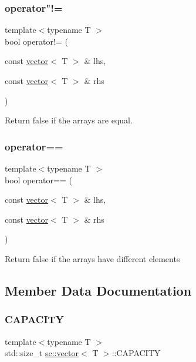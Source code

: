 \subsubsection{\texorpdfstring{operator"!=}{operator!=}}
{\footnotesize\ttfamily template$<$typename T $>$ \\
bool operator!= (\begin{DoxyParamCaption}\item[{const \hyperlink{classsc_1_1vector}{vector}$<$ T $>$ \&}]{lhs,  }\item[{const \hyperlink{classsc_1_1vector}{vector}$<$ T $>$ \&}]{rhs }\end{DoxyParamCaption})\hspace{0.3cm}{\ttfamily [friend]}}

Return false if the arrays are equal. \mbox{\label{classsc_1_1vector_a33679563540934e4c3e487aa12a63424}} 
\subsubsection{\texorpdfstring{operator==}{operator==}}
{\footnotesize\ttfamily template$<$typename T $>$ \\
bool operator== (\begin{DoxyParamCaption}\item[{const \hyperlink{classsc_1_1vector}{vector}$<$ T $>$ \&}]{lhs,  }\item[{const \hyperlink{classsc_1_1vector}{vector}$<$ T $>$ \&}]{rhs }\end{DoxyParamCaption})\hspace{0.3cm}{\ttfamily [friend]}}

Return false if the arrays have different elements 

\subsection{Member Data Documentation}
\mbox{\label{classsc_1_1vector_ae4c67859be8cfdd445d2700d55125184}} 
\subsubsection{\texorpdfstring{C\+A\+P\+A\+C\+I\+TY}{CAPACITY}}
{\footnotesize\ttfamily template$<$typename T $>$ \\
std\+::size\+\_\+t \hyperlink{classsc_1_1vector}{sc\+::vector}$<$ T $>$\+::C\+A\+P\+A\+C\+I\+TY\hspace{0.3cm}{\ttfamily [private]}}



